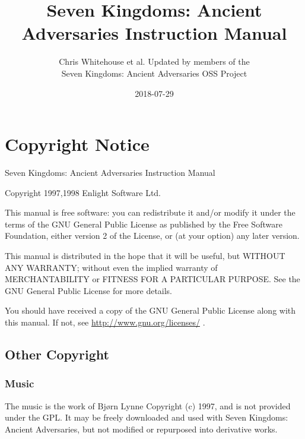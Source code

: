 \documentclass[openany,a4paper,12pt]{book}
\begin{document}
\begin{titlepage}
	\title{Seven Kingdoms: Ancient Adversaries Instruction Manual}
	\author{Chris Whitehouse et al. Updated by members of the \\
		Seven Kingdoms: Ancient Adversaries OSS Project}
	\date{2018-07-29}
\end{titlepage}
\frontmatter
\maketitle

\section{Copyright Notice}

Seven Kingdoms: Ancient Adversaries Instruction Manual

Copyright 1997,1998 Enlight Software Ltd.

This manual is free software: you can redistribute it and/or modify it under the terms of the GNU General Public License as published by the Free Software Foundation, either version 2 of the License, or (at your option) any later version.

This manual is distributed in the hope that it will be useful, but WITHOUT ANY WARRANTY; without even the implied warranty of MERCHANTABILITY or FITNESS FOR A PARTICULAR PURPOSE.  See the GNU General Public License for more details.

You should have received a copy of the GNU General Public License along with this manual.  If not, see \href{<http://www.gnu.org/licenses/>}{http://www.gnu.org/licenses/} .

\subsection{Other Copyright}

\subsubsection{Music}

The music is the work of Bjørn Lynne Copyright (c) 1997, and is not provided under the GPL. It may be freely downloaded and used with Seven Kingdoms: Ancient Adversaries, but not modified or repurposed into derivative works. 
\end{document}
